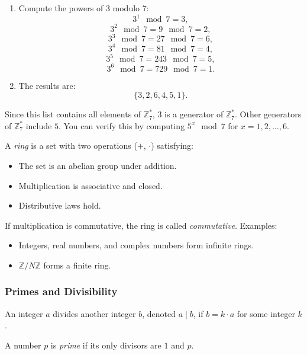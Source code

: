 \begin{enumerate}
    \item Compute the powers of \( 3 \) modulo \( 7 \):
    \[
    3^1 \mod 7 = 3,
    \]
    \[
    3^2 \mod 7 = 9 \mod 7 = 2,
    \]
    \[
    3^3 \mod 7 = 27 \mod 7 = 6,
    \]
    \[
    3^4 \mod 7 = 81 \mod 7 = 4,
    \]
    \[
    3^5 \mod 7 = 243 \mod 7 = 5,
    \]
    \[
    3^6 \mod 7 = 729 \mod 7 = 1.
    \]

    \item The results are:
    \[
    \{ 3, 2, 6, 4, 5, 1 \}.
    \]
\end{enumerate}

Since this list contains all elements of \( \mathbb{Z}_7^* \), \( 3 \) is a generator of \( \mathbb{Z}_7^* \). Other generators of \( \mathbb{Z}_7^* \) include \( 5 \). You can verify this by computing \( 5^x \mod 7 \) for \( x = 1, 2, \dots, 6 \).

\begin{defn}
    A \emph{ring} is a set with two operations (\(+\), \(\cdot\)) satisfying:
    \begin{itemize}
        \item The set is an abelian group under addition.
        \item Multiplication is associative and closed.
        \item Distributive laws hold.
    \end{itemize}
    \end{defn}

If multiplication is commutative, the ring is called \emph{commutative}. Examples:
\begin{itemize}
        \item Integers, real numbers, and complex numbers form infinite rings.
        \item \( \mathbb{Z}/N\mathbb{Z} \) forms a finite ring.
\end{itemize}
    
\subsubsection{Primes and Divisibility}
\begin{defn}
    An integer \( a \) divides another integer \( b \), denoted \( a \mid b \), if \( b = k \cdot a \) for some integer \( k \).
    \end{defn}
    
\begin{defn}
    A number \( p \) is \emph{prime} if its only divisors are \( 1 \) and \( p \).
    \end{defn}
    
